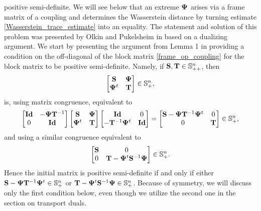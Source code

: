\documentclass{amsart}
\numberwithin{equation}{section}
\newcommand\bS{{\bf S}}
\newcommand\bT{{\bf T}}
\newcommand\id{{\operatorname{\bf Id}}}
\theoremstyle{plain}
\theoremstyle{definition}
\begin{document}
positive semi-definite. We will see below that an extreme $\bf \Psi$ arises via a frame matrix of a coupling and  
determines the Wasserstein distance by turning estimate \ref{Wasserstein_trace_estimate} into an equality. 
The statement and solution of this problem was presented by Olkin and Pukelsheim in \cite{olkin1982distance} based on a dualizing argument. 
We start by presenting the argument from Lemma 1 in \cite{olkin1982distance} providing a condition on the off-diagonal of the block matrix \ref{frame_op_coupling} for the block matrix to be positive semi-definite. Namely, if $\bS, \bT \in \mathbb{S}^n_{++}$, then  
\begin{equation}\label{block-matrix}
\begin{bmatrix}
\bS & {\bf \Psi} \\
 {\bf \Psi}^t & \bT 
\end{bmatrix} \in \mathbb{S}^n_{+},  
\end{equation}
is, using matrix congruence, equivalent to 
\[\begin{bmatrix}
\id & -{\bf \Psi}\bT^{-1} \\
 0 & \id 
\end{bmatrix}
\begin{bmatrix}
\bS & {\bf \Psi} \\
 {\bf \Psi}^t & \bT 
\end{bmatrix}
\begin{bmatrix}
\id & 0 \\
-\bT^{-1} {\bf \Psi}^t & \id 
\end{bmatrix}
=
\begin{bmatrix}
\bS- {\bf \Psi} \bT^{-1} {\bf \Psi}^t & 0 \\
 0 & \bT 
\end{bmatrix}
 \in \mathbb{S}^n_{+}, 
\]
and using a similar congruence equivalent to
\[\begin{bmatrix}
\bS & 0 \\
 0 & \bT - {\bf \Psi}^t \bS^{-1} {\bf \Psi}
\end{bmatrix}
 \in \mathbb{S}^n_{+}.
\]
Hence the initial matrix  is positive semi-definite if and only if either $\bS- {\bf \Psi} \bT^{-1} {\bf \Psi}^t  \in \mathbb{S}^n_{+}$ or  
$\bT- {\bf \Psi}^t \bS^{-1} {\bf \Psi} \in \mathbb{S}^n_{+}$. Because of symmetry, we will discuss only the first condition below, even though we utilize the second one in the section on transport duals. 
\end{document}
